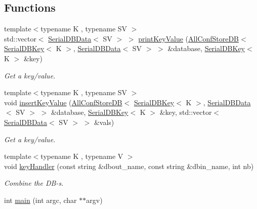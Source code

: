 \subsection*{Functions}
\begin{DoxyCompactItemize}
\item 
{\footnotesize template$<$typename K , typename SV $>$ }\\std\+::vector$<$ \mbox{\hyperlink{classADATIO_1_1SerialDBData}{Serial\+D\+B\+Data}}$<$ SV $>$ $>$ \mbox{\hyperlink{adat-devel_2main_2dbutil_2dbbin_8cc_ad99136392a8c4064c84803fee6e0c857}{print\+Key\+Value}} (\mbox{\hyperlink{classFILEDB_1_1AllConfStoreDB}{All\+Conf\+Store\+DB}}$<$ \mbox{\hyperlink{classADATIO_1_1SerialDBKey}{Serial\+D\+B\+Key}}$<$ K $>$, \mbox{\hyperlink{classADATIO_1_1SerialDBData}{Serial\+D\+B\+Data}}$<$ SV $>$ $>$ \&database, \mbox{\hyperlink{classADATIO_1_1SerialDBKey}{Serial\+D\+B\+Key}}$<$ K $>$ \&key)
\begin{DoxyCompactList}\small\item\em Get a key/value. \end{DoxyCompactList}\item 
{\footnotesize template$<$typename K , typename SV $>$ }\\void \mbox{\hyperlink{adat-devel_2main_2dbutil_2dbbin_8cc_a8dcef9d29a9dfc5045f4ee378e94fca3}{insert\+Key\+Value}} (\mbox{\hyperlink{classFILEDB_1_1AllConfStoreDB}{All\+Conf\+Store\+DB}}$<$ \mbox{\hyperlink{classADATIO_1_1SerialDBKey}{Serial\+D\+B\+Key}}$<$ K $>$, \mbox{\hyperlink{classADATIO_1_1SerialDBData}{Serial\+D\+B\+Data}}$<$ SV $>$ $>$ \&database, \mbox{\hyperlink{classADATIO_1_1SerialDBKey}{Serial\+D\+B\+Key}}$<$ K $>$ \&key, std\+::vector$<$ \mbox{\hyperlink{classADATIO_1_1SerialDBData}{Serial\+D\+B\+Data}}$<$ SV $>$ $>$ \&vals)
\begin{DoxyCompactList}\small\item\em Get a key/value. \end{DoxyCompactList}\item 
{\footnotesize template$<$typename K , typename V $>$ }\\void \mbox{\hyperlink{adat-devel_2main_2dbutil_2dbbin_8cc_accb30c2dbf14041f0de262e403fdace9}{key\+Handler}} (const string \&dbout\+\_\+name, const string \&dbin\+\_\+name, int nb)
\begin{DoxyCompactList}\small\item\em Combine the D\+B-\/s. \end{DoxyCompactList}\item 
int \mbox{\hyperlink{adat-devel_2main_2dbutil_2dbbin_8cc_a3c04138a5bfe5d72780bb7e82a18e627}{main}} (int argc, char $\ast$$\ast$argv)
\end{DoxyCompactItemize}


